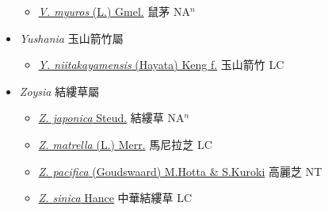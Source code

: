 \begin{itemize}
  \begin{itemize}
        \item[] \href{http://www.theplantlist.org/tpl1.1/search?q=Vulpia+myuros}{\textit{V. myuros} (L.) Gmel.}   鼠茅 NA$^n$
  \end{itemize}
 \item[] \textit{Yushania} 玉山箭竹屬
                    
  \begin{itemize}
        \item[] \href{http://www.theplantlist.org/tpl1.1/search?q=Yushania+niitakayamensis}{\textit{Y. niitakayamensis} (Hayata) Keng f.}   玉山箭竹 LC
  \end{itemize}
 \item[] \textit{Zoysia} 結縷草屬
                    
  \begin{itemize}
        \item[] \href{http://www.theplantlist.org/tpl1.1/search?q=Zoysia+japonica}{\textit{Z. japonica} Steud.}   結縷草 NA$^n$
        \item[] \href{http://www.theplantlist.org/tpl1.1/search?q=Zoysia+matrella}{\textit{Z. matrella} (L.) Merr.}   馬尼拉芝 LC
        \item[] \href{http://www.theplantlist.org/tpl1.1/search?q=Zoysia+pacifica}{\textit{Z. pacifica} (Goudswaard) M.Hotta \& S.Kuroki}     高麗芝 NT
        \item[] \href{http://www.theplantlist.org/tpl1.1/search?q=Zoysia+sinica}{\textit{Z. sinica} Hance}   中華結縷草 LC
  \end{itemize}
  \end{itemize}
